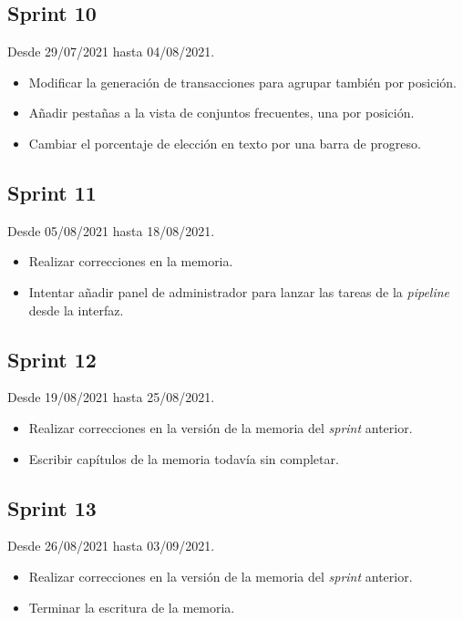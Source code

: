 \subsection{Sprint 10}

Desde 29/07/2021 hasta 04/08/2021.

\begin{itemize}
	\item Modificar la generación de transacciones para agrupar también por posición.
	\item Añadir pestañas a la vista de conjuntos frecuentes, una por posición.
	\item Cambiar el porcentaje de elección en texto por una barra de progreso.
\end{itemize}

\subsection{Sprint 11}

Desde 05/08/2021 hasta 18/08/2021.

\begin{itemize}
	\item Realizar correcciones en la memoria.
	\item Intentar añadir panel de administrador para lanzar las tareas de la \textit{pipeline} desde la interfaz.
\end{itemize}

\subsection{Sprint 12}

Desde 19/08/2021 hasta 25/08/2021.

\begin{itemize}
	\item Realizar correcciones en la versión de la memoria del \textit{sprint} anterior.
	\item Escribir capítulos de la memoria todavía sin completar.
\end{itemize}

\subsection{Sprint 13}

Desde 26/08/2021 hasta 03/09/2021.

\begin{itemize}
	\item Realizar correcciones en la versión de la memoria del \textit{sprint} anterior.
	\item Terminar la escritura de la memoria.
\end{itemize}

